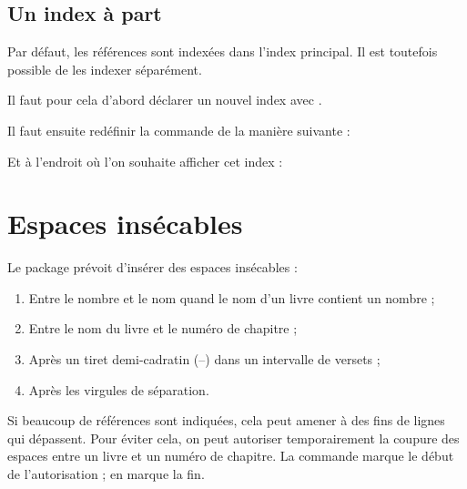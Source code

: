 \subsection{Un index à part}

Par défaut, les références sont indexées dans l'index principal. Il est toutefois possible  de les indexer séparément.

Il faut pour cela d'abord déclarer un nouvel index avec .

\begin{latexcode}
\end{latexcode}

Il faut ensuite redéfinir la commande  de la manière suivante :

\begin{latexcode}
\renewcommand{\biblerefindex}[0]{\sindex[bible]}
\end{latexcode}

Et à l'endroit où l'on souhaite afficher cet index :

\begin{latexcode}
\printindex[bible]
\end{latexcode}

\section{Espaces insécables}

Le package  prévoit d'insérer des espaces insécables :
\begin{enumerate}
\item Entre le nombre et le nom quand le nom d’un livre contient un nombre ;
\item Entre le nom du livre et le numéro de chapitre ;
\item Après un tiret demi-cadratin (–) dans un intervalle de versets ; 
\item Après les virgules de séparation.
\end{enumerate}

Si beaucoup de références sont indiquées, cela peut amener à des fins de lignes qui dépassent.
Pour éviter cela, on peut autoriser temporairement la coupure des espaces entre un livre et un numéro de chapitre. La commande  marque le début de l'autorisation ;  en marque la fin.

